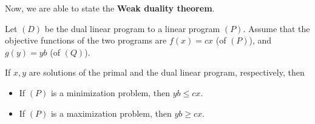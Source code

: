 Now, we are able to state the \textbf{Weak duality theorem}.

\begin{theorem}
\label{thr:Weak duality theorem}
  Let \( (D) \) be the dual linear program to a linear program \( (P) \). Assume
  that the objective functions of the two programs are \( f(x) = cx \) (of \(
  (P) \)), and \( g(y) = yb \) (of \( (Q) \)).

  If \( x, y \) are solutions of the primal and the dual linear program,
  respectively, then
  \begin{itemize}
  \item If \( (P) \) is a minimization problem, then \( yb \le cx \).
  \item If \( (P) \) is a maximization problem, then \( yb \ge  cx \).
  \end{itemize}
\end{theorem}

